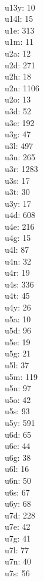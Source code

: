 \begin{multicols}{8}
  \\u13y: 10
  \\u14l: 15
  \\u1e: 313
  \\u1m: 11
  \\u2a: 12
  \\u2d: 271
  \\u2h: 18
  \\u2n: 1106
  \\u2o: 13
  \\u3d: 52
  \\u3e: 192
  \\u3g: 47
  \\u3l: 497
  \\u3n: 265
  \\u3r: 1283
  \\u3s: 17
  \\u3t: 30
  \\u3y: 17
  \\u4d: 608
  \\u4e: 216
  \\u4g: 15
  \\u4l: 87
  \\u4n: 32
  \\u4r: 19
  \\u4s: 336
  \\u4t: 45
  \\u4y: 26
  \\u5a: 10
  \\u5d: 96
  \\u5e: 19
  \\u5g: 21
  \\u5l: 37
  \\u5m: 119
  \\u5n: 97
  \\u5o: 42
  \\u5s: 93
  \\u5y: 591
  \\u6d: 65
  \\u6e: 44
  \\u6g: 38
  \\u6l: 16
  \\u6n: 50
  \\u6s: 67
  \\u6y: 68
  \\u7d: 228
  \\u7e: 42
  \\u7g: 41
  \\u7l: 77
  \\u7n: 40
  \\u7s: 56

\end{multicols}
